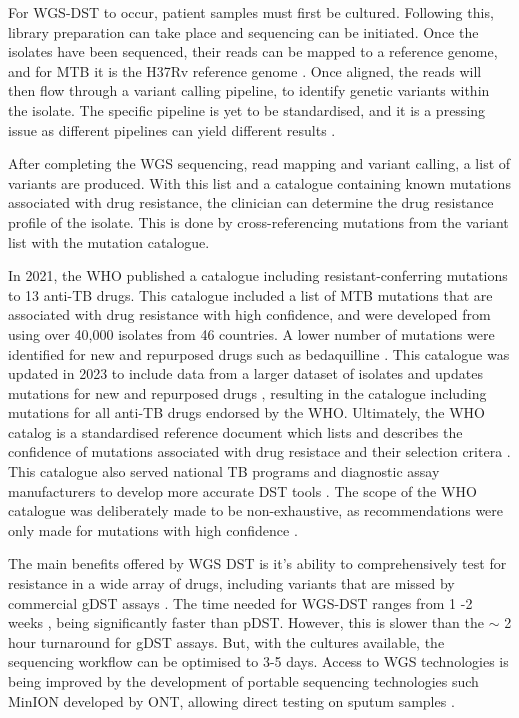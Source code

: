 For WGS-DST to occur, patient samples must first be cultured. Following this, library preparation can take place and sequencing can be initiated. Once the isolates have been sequenced, their reads can be mapped to a reference genome,  and for MTB it is the H37Rv reference genome \cite{meehan2018}. Once aligned, the reads will then flow through a variant calling pipeline, to identify genetic variants within the isolate. The specific pipeline is yet to be standardised, and it is a pressing issue as different pipelines can yield different results \cite{walter2020genvar,meehan2018}. 

After completing the WGS sequencing, read mapping and variant calling, a list of variants are produced. With this list and a catalogue containing known mutations associated with drug resistance, the clinician can determine the drug resistance profile of the isolate. This is done by cross-referencing mutations from the variant list with the mutation catalogue. 

In 2021, the WHO published a catalogue including resistant-conferring mutations to 13 anti-TB drugs. This catalogue included a list of MTB mutations that are associated with drug resistance with high confidence, and were developed from using over 40,000 isolates from 46 countries. A lower number of mutations were identified for new and repurposed drugs such as bedaquilline \cite{Walker2022}. This catalogue was updated in 2023 to include data from a larger dataset of isolates and updates mutations for new and repurposed drugs \cite{WHOcatalog}, resulting in the catalogue including mutations for all anti-TB drugs endorsed by the WHO. Ultimately, the WHO catalog is a standardised reference document which lists and describes the confidence of mutations associated with drug resistace and their selection critera \cite{Walker2022,WHOcatalog}. This catalogue also served national TB programs and diagnostic assay manufacturers to develop more accurate DST tools \cite{WHOcatalog}. The scope of the WHO catalogue was deliberately made to be non-exhaustive, as recommendations were only made for mutations with high confidence \cite{Walker2022}.

The main benefits offered by WGS DST is it's ability to comprehensively test for resistance in a wide array of drugs, including variants that are missed by commercial gDST assays \cite{dean202225}. The time needed for WGS-DST ranges from 1 -2 weeks \cite{whitney2016}, being significantly faster than pDST. However, this is slower than the $\sim$ 2 hour turnaround for gDST assays. But, with the cultures available, the sequencing workflow can be optimised to 3-5 days\cite{whitney2016}. Access to WGS technologies is being improved by the development of portable sequencing technologies such MinION developed by ONT, allowing direct testing on sputum samples \cite{hall2023evaluation,smith2020assessing}. 

